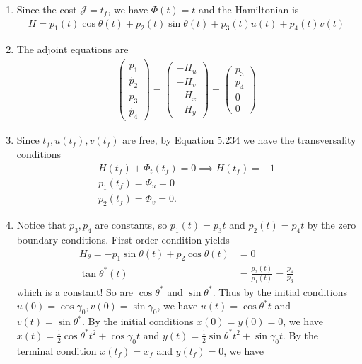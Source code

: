 \documentclass[12pt]{article}
\begin{document}
\begin{problem}[4]
\begin{enumerate}[label=(\alph*)]
\item Since the cost $ \mathcal{ J} = t_f$, we have $ \Phi(t) = t$ and the Hamiltonian is
	\begin{align*}
		H= p_1(t) \cos \theta (t) + p_2(t) \sin \theta(t) + p_3(t) u(t) + p_4(t) v(t)
	\end{align*}
\item The adjoint equations are
\begin{align*}
	\begin{pmatrix} \dot{p_1}\\\dot{p_2}\\\dot{p_3}\\ \dot{p_4} \end{pmatrix} = \begin{pmatrix} -H_u\\-H_v\\-H_x\\-H_y \end{pmatrix} = \begin{pmatrix} p_3\\p_4\\0\\0 \end{pmatrix} 
\end{align*}
\item Since $ t_f, u(t_f),v(t_f)$ are free, by Equation 5.234 we have  the transversality conditions
	\begin{align*}
		H(t_f) + \Phi_t(t_f) = 0 \implies H(t_f) = -1 \\
		p_1(t_f) = \Phi_u = 0\\
		p_2(t_f) = \Phi_v = 0 .
	\end{align*}
\item Notice that $ p_3,p_4$ are constants, so $ p_1(t) = p_3t$ and $ p_2(t) = p_4t$ by the zero boundary conditions. First-order condition yields
\begin{align*}
	H_\theta = -p_1 \sin \theta(t) + p_2 \cos \theta(t) &= 0 \\
	\tan \theta^*(t)  &= \frac{p_2(t)}{ p_1(t)} = \frac{p_4}{ p_3}
\end{align*}
which is a constant! So are $ \cos \theta^* $ and $ \sin \theta^* $. Thus by the initial conditions $u(0)= \cos \gamma_0, v(0) = \sin \gamma_0$, we have $ u(t) = \cos \theta^* t$ and $ v(t) = \sin \theta^* $. By the initial conditions $x(0)=y(0)=0$, we have $ x(t) = \frac{1}{2} \cos \theta^* t^2 + \cos \gamma_0 t$ and $ y(t) = \frac{1}{2} \sin \theta^* t^2+ \sin \gamma_0 t$. By the terminal condition $ x(t_f)=x_f$ and  $ y(t_f)=0$, we have 

\end{enumerate}
\end{problem}
\end{document}
